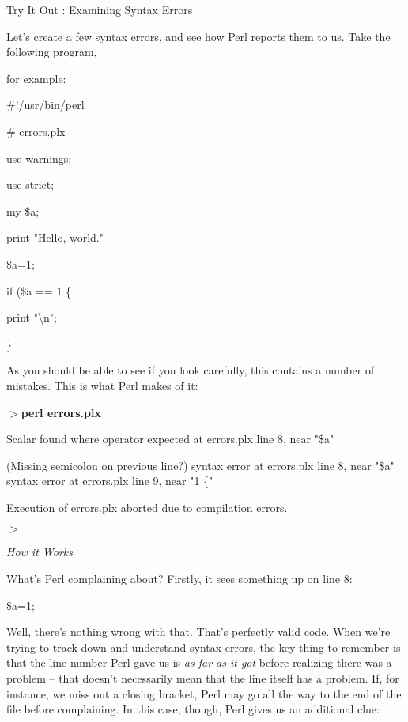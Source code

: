 \documentclass[a4paper,11pt]{book}
\begin{document}
\noindent Try It Out : Examining Syntax Errors

\noindent 

\noindent Let's create a few syntax errors, and see how Perl reports them to us. Take the following program,

\noindent for example:

\noindent 

\noindent \#!/usr/bin/perl

\noindent \# errors.plx

\noindent use warnings;

\noindent use strict;

\noindent 

\noindent my \$a;

\noindent print "Hello, world."

\noindent \$a=1;

\noindent if (\$a == 1 \{

\noindent print "\textbackslash n";

\noindent \}

\noindent 

\noindent As you should be able to see if you look carefully, this contains a number of mistakes. This is what Perl makes of it:

\noindent 

\noindent $>$\textbf{perl errors.plx}

\noindent Scalar found where operator expected at errors.plx line 8, near "\$a"

(Missing semicolon on previous line?) syntax error at errors.plx line 8, near "\$a" syntax error at errors.plx line 9, near "1 \{"

\noindent Execution of errors.plx aborted due to compilation errors.

\noindent $>$

\noindent 

\noindent \textit{How it Works}

\noindent What's Perl complaining about? Firstly, it sees something up on line 8:

\noindent 

\noindent \$a=1;

\noindent 

\noindent Well, there's nothing wrong with that. That's perfectly valid code. When we're trying to track down and understand syntax errors, the key thing to remember is that the line number Perl gave us is \textit{as far as it got }before realizing there was a problem -- that doesn't necessarily mean that the line itself has a problem. If, for instance, we miss out a closing bracket, Perl may go all the way to the end of the file before complaining. In this case, though, Perl gives us an additional clue:
\end{document}
